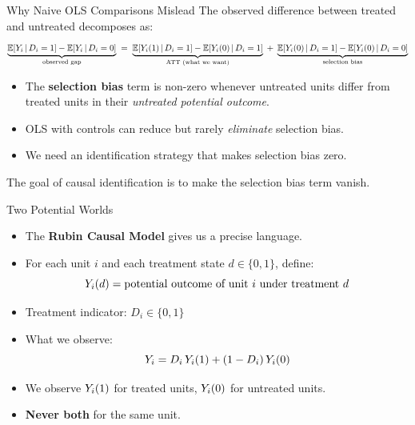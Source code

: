 \documentclass[aspectratio=169, 11pt]{beamer}
\begin{document}
\begin{frame}[t]{Why Naive OLS Comparisons Mislead}
\vspace{0.2em}
The observed difference between treated and untreated decomposes as:
\[
  \underbrace{\mathbb{E}\!\left[Y_i\,\middle|\,D_i=1\right] - \mathbb{E}\!\left[Y_i\,\middle|\,D_i=0\right]}_{\text{observed gap}}
  \;=\;
  \underbrace{\mathbb{E}\!\left[Y_{i}(1)\,\middle|\,D_i=1\right] - \mathbb{E}\!\left[Y_{i}(0)\,\middle|\,D_i=1\right]}_{\text{ATT (what we want)}}
  \;+\;
  \underbrace{\mathbb{E}\!\left[Y_{i}(0)\,\middle|\,D_i=1\right] - \mathbb{E}\!\left[Y_{i}(0)\,\middle|\,D_i=0\right]}_{\text{selection bias}}
\]
\vspace{0.3em}
\begin{itemize}
  \setlength\itemsep{0.4em}
  \item The \textbf{selection bias} term is non-zero whenever untreated units differ
        from treated units in their \emph{untreated potential outcome}.
  \item OLS with controls can reduce but rarely \emph{eliminate} selection bias.
  \item We need an identification strategy that makes selection bias zero.
\end{itemize}
\begin{keybox}
The goal of causal identification is to make the selection bias term vanish.
\end{keybox}
\end{frame}


\begin{frame}[t]{Two Potential Worlds}
\begin{itemize}
  \setlength\itemsep{0.5em}
  \item The \textbf{Rubin Causal Model} \citep{AngristPischke2009} gives us a precise language.
  \item For each unit $i$ and each treatment state $d \in \{0,1\}$, define:
  \[
    Y_{i}(d) = \text{potential outcome of unit } i \text{ under treatment } d
  \]
  \item Treatment indicator: $D_i \in \{0,1\}$
  \item What we observe:
  \[
    Y_i = D_i \,Y_{i}(1) + (1-D_i)\,Y_{i}(0)
  \]
  \item We observe $Y_{i}(1)$ for treated units, $Y_{i}(0)$ for untreated units.
  \item \textbf{Never both} for the same unit.
\end{itemize}
\end{frame}
\end{document}
